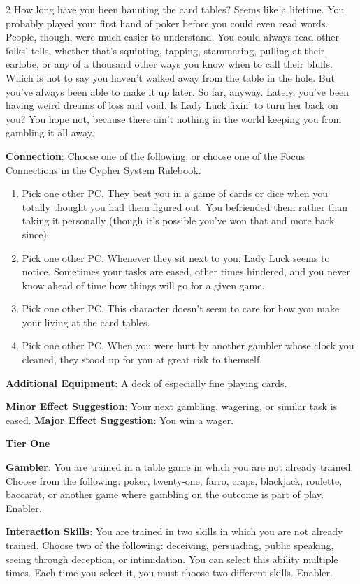 \begin{multicols}{2}
How long have you been haunting the card tables? Seems like a lifetime. You probably played your first hand of poker before you could even read words. People, though, were much easier to understand. You could always read other folks’ tells, whether that’s squinting, tapping, stammering, pulling at their earlobe, or any of a thousand other ways you know when to call their bluffs. Which is not to say you haven’t walked away from the table in the hole. But you’ve always been able to make it up later. So far, anyway. Lately, you’ve been having weird dreams of loss and void. Is Lady Luck fixin’ to turn her back on you? You hope not, because there ain’t nothing in the world keeping you from gambling it all away.

\textbf{Connection}: Choose one of the following, or choose one of the Focus Connections in the Cypher System Rulebook. 

\begin{enumerate}
\item Pick one other PC. They beat you in a game of cards or dice when you totally thought you had them figured out. You befriended them rather than taking it personally (though it’s possible you’ve won that and more back since). 
\item Pick one other PC. Whenever they sit next to you, Lady Luck seems to notice. Sometimes your tasks are eased, other times hindered, and you never know ahead of time how things will go for a given game. 
\item Pick one other PC. This character doesn’t seem to care for how you make your living at the card tables. 
\item Pick one other PC. When you were hurt by another gambler whose clock you cleaned, they stood up for you at great risk to themself. 
\end{enumerate}

\textbf{Additional Equipment}: A deck of especially fine playing cards. 

\textbf{Minor Effect Suggestion}: Your next gambling, wagering, or similar task is eased. 
\textbf{Major Effect Suggestion}: You win a wager. 

\textbf{Tier One}

\textbf{Gambler}: You are trained in a table game in which you are not already trained. Choose from the following: poker, twenty-one, farro, craps, blackjack, roulette, baccarat, or another game where gambling on the outcome is part of play. Enabler. 

\textbf{Interaction Skills}: You are trained in two skills in which you are not already trained. Choose two of the following: deceiving, persuading, public speaking, seeing through deception, or intimidation. You can select this ability multiple times. Each time you select it, you must choose two different skills. Enabler. 


\end{multicols}
